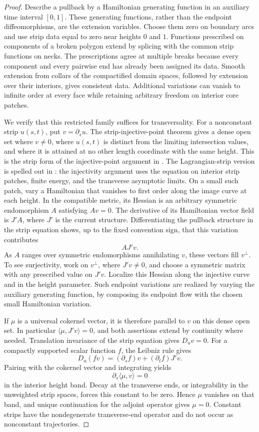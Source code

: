 \documentclass[11pt]{article}
\numberwithin{equation}{section}
\theoremstyle{definition}
\theoremstyle{remark}
\begin{document}
\begin{proof}
Describe a pullback by a Hamiltonian generating function in an
auxiliary time interval $[0,1]$.  These generating functions, rather
than the endpoint diffeomorphisms, are the extension variables.
Choose them zero on boundary arcs and use strip data equal to zero
near heights $0$ and $1$.  Functions prescribed on components of a
broken polygon extend by splicing with the common strip functions
on necks.  The prescriptions agree at multiple breaks because every
component and every pairwise end has already been assigned its data.
Smooth extension from collars of the compactified domain spaces,
followed by extension over their interiors, gives consistent data.
Additional variations can vanish to infinite order at every face
while retaining arbitrary freedom on interior core patches.

We verify that this restricted family suffices for transversality.
For a nonconstant strip $u(s,t)$, put $v=\partial_su$.  The
strip-injective-point theorem gives a dense open set where $v\ne0$,
where $u(s,t)$ is distinct from the limiting intersection values, and
where it is attained at no other length coordinate with the same
height.  This is the strip form of the injective-point argument in
\cite[Sections~3--5]{HMS:FHS}.  The Lagrangian-strip version is
spelled out in \cite[proof of Lemma~5.12, the set $R_1(u)$]{HMS:KhovanovSeidel}:
the injectivity argument uses the equation on interior strip
patches, finite energy, and the transverse asymptotic limits.
On a small such patch, vary a Hamiltonian that vanishes to first
order along the image curve at each height.  In the compatible metric,
its Hessian is an arbitrary symmetric endomorphism $A$ satisfying
$Av=0$.  The derivative of its Hamiltonian vector field is $J'A$,
where $J'$ is the current structure.  Differentiating the pullback
structure in the strip equation shows, up to the fixed convention
sign, that this variation contributes
\[
 A J'v.
\]
As $A$ ranges over symmetric endomorphisms annihilating $v$, these
vectors fill $v^\perp$.  To see surjectivity, work on $v^\perp$,
where $J'v\ne0$, and choose a symmetric matrix with any prescribed
value on $J'v$.  Localize this Hessian along the injective curve and
in the height parameter.  Such endpoint variations are realized by
varying the auxiliary generating function, by composing its
endpoint flow with the chosen small Hamiltonian variation.

If $\mu$ is a universal cokernel vector, it is therefore parallel
to $v$ on this dense open set.  In particular
$\langle\mu,J'v\rangle=0$, and both assertions extend by continuity
where needed.  Translation invariance of the strip equation gives
$D_uv=0$.  For a compactly supported scalar function $f$, the
Leibniz rule gives
\[
 D_u(fv)=(\partial_sf)v+(\partial_tf)J'v.
\]
Pairing with the cokernel vector and integrating yields
\[
 \partial_s\langle\mu,v\rangle=0
\]
in the interior height band.  Decay at the transverse ends, or
integrability in the unweighted strip spaces, forces this constant
to be zero.  Hence $\mu$ vanishes on that band, and unique
continuation for the adjoint operator gives $\mu=0$.  Constant
strips have the nondegenerate transverse-end operator and do not
occur as nonconstant trajectories.


\end{proof}
\end{document}
